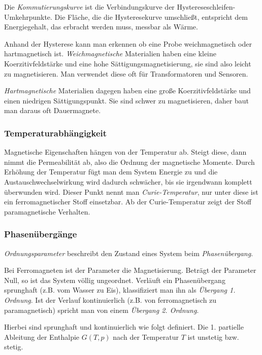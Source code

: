 \documentclass[12pt,a4paper]{scrartcl}
\numberwithin{equation}{section} %
\begin{document}
Die \emph{Kommutierungskurve} ist die Verbindungskurve der
Hystereseschleifen-Umkehrpunkte. Die Fläche, die die Hysteresekurve
umschließt, entspricht dem Energiegehalt, das erbracht werden muss,
messbar als Wärme.

Anhand der Hysterese kann man erkennen ob eine Probe weichmagnetisch
oder hartmagnetisch ist. \emph{Weichmagnetische} Materialien haben eine
kleine Koerzitivfeldstärke und eine hohe Sättigungsmagnetisierung, sie
sind also leicht zu magnetisieren. Man verwendet diese oft für
Transformatoren und Sensoren.

\emph{Hartmagnetische} Materialien dagegen haben eine große
Koerzitivfeldstärke und einen niedrigen Sättigungspunkt. Sie sind schwer
zu magnetisieren, daher baut man daraus oft Dauermagnete.

\hypertarget{temperaturabhuxe4ngigkeit}{%
\subsubsection{Temperaturabhängigkeit}\label{temperaturabhuxe4ngigkeit}}

Magnetische Eigenschaften hängen von der Temperatur ab. Steigt diese,
dann nimmt die Permeabilität ab, also die Ordnung der magnetische
Momente. Durch Erhöhung der Temperatur fügt man dem System Energie zu
und die Austauschwechselwirkung wird dadurch schwächer, bis sie
irgendwann komplett überwunden wird. Dieser Punkt nennt man
\emph{Curie-Temperatur}, nur unter diese ist ein ferromagnetischer Stoff
einsetzbar. Ab der Curie-Temperatur zeigt der Stoff paramagnetische
Verhalten.

\hypertarget{phasenuxfcberguxe4nge}{%
\subsubsection{Phasenübergänge}\label{phasenuxfcberguxe4nge}}

\emph{Ordnungsparameter} beschreibt den Zustand eines System beim
\emph{Phasenübergang}.

Bei Ferromagneten ist der Parameter die Magnetisierung. Beträgt der
Parameter Null, so ist das System völlig ungeordnet. Verläuft ein
Phasenübergang sprunghaft (z.B. vom Wasser zu Eis), klassifiziert man
ihn als \emph{Übergang 1. Ordnung}. Ist der Verlauf kontinuierlich (z.B.
von ferromagnetisch zu paramagnetisch) spricht man von einem
\emph{Übergang 2. Ordnung}.

Hierbei sind sprunghaft und kontinuierlich wie folgt definiert. Die 1.
partielle Ableitung der Enthalpie $G(T,p)$ nach der Temperatur $T$
ist unstetig bzw. stetig.
\end{document}
